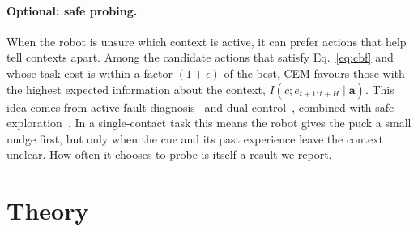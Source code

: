 \documentclass[10pt]{article}
\begin{document}
\paragraph{Optional: safe probing.}
When the robot is unsure which context is active, it can prefer actions that help tell contexts
apart. Among the candidate actions that satisfy Eq.~\eqref{eq:cbf} and whose task cost is within a
factor $(1+\epsilon)$ of the best, CEM favours those with the highest expected information about the
context, $I(c;e_{t+1:t+H}\mid\mathbf a)$. This idea comes from active fault
diagnosis~\cite{blackmore2006discrimination,blackmore2008active,simandl2009afd} and dual
control~\cite{mesbah2018dual,heirung2019mpcdiscrimination}, combined with safe
exploration~\cite{koller2018learning,berkenkamp2017safe}. In a single-contact task this means the robot
gives the puck a small nudge first, but only when the cue and its past experience leave the context
unclear. How often it chooses to probe is itself a result we report.

\section{Theory}
\end{document}
